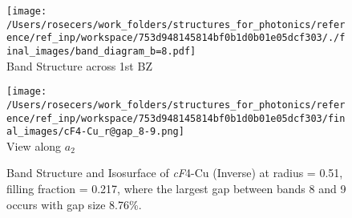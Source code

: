 \begin{figure}[H]
\begin{minipage}{0.5\textwidth}\centering
\texttt{[image: /Users/rosecers/work\_folders/structures\_for\_photonics/reference/ref\_inp/workspace/753d948145814bf0b1d0b01e05dcf303/./final\_images/band\_diagram\_b=8.pdf]}
\\Band Structure across 1st BZ
\end{minipage}\hfill
\begin{minipage}{0.48\textwidth}\centering
\texttt{[image: /Users/rosecers/work\_folders/structures\_for\_photonics/reference/ref\_inp/workspace/753d948145814bf0b1d0b01e05dcf303/final\_images/cF4-Cu\_r@gap\_8-9.png]}
\\View along $a_2$ 
\end{minipage}\hfill\caption{Band Structure and Isosurface of \textit{cF}4-Cu (Inverse) at radius = 0.51, filling fraction = 0.217, where the largest gap between bands 8 and 9 occurs with gap size 8.76\%.}

\end{figure}
\vspace{-0.25in}

